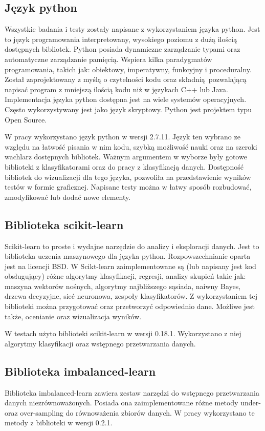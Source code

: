 \subsection{Język python}
Wszystkie badania i testy zostały napisane z wykorzystaniem języka python. Jest to język programowania interpretowany, wysokiego poziomu z dużą ilością dostępnych bibliotek. Python\cite{python} posiada dynamiczne zarządzanie typami oraz automatyczne zarządzanie pamięcią. Wspiera kilka paradygmatów programowania, takich jak: obiektowy, imperatywny, funkcyjny i proceduralny. Został zaprojektowany z myślą o czytelności kodu oraz składnią pozwalającą napisać program z mniejszą ilością kodu niż w językach C++ lub Java. Implementacja języka python dostępna jest na wiele systemów operacyjnych. Często wykorzystywany jest jako język skryptowy. Python jest projektem typu Open Source. \par
W pracy wykorzystano język python w wersji 2.7.11. Język ten wybrano ze względu na łatwość pisania w nim kodu, szybką możliwość nauki oraz na szeroki wachlarz dostępnych bibliotek. Ważnym argumentem w wyborze były gotowe biblioteki z klasyfikatorami oraz do pracy z klasyfikacją danych. Dostępność bibliotek do wizualizacji dla tego języka, pozwoliła na przedstawienie wyników testów w formie graficznej. Napisane testy można w łatwy sposób rozbudować, zmodyfikować lub dodać nowe elementy.    

\subsection{Biblioteka scikit-learn}
Scikit-learn\cite{scikit} to proste i wydajne narzędzie do analizy i eksploracji danych. Jest to biblioteka uczenia maszynowego dla języka python. Rozpowszechnianie oparta jest na licencji BSD. W Scikt-learn zaimplementowane są (lub napisany jest kod obsługujący) różne algorytmy klasyfikacji, regresji, analizy skupień takie jak: maszyna wektorów nośnych, algorytmy najbliższego sąsiada, naiwny Bayes, drzewa decyzyjne, sieć neuronowa, zespoły klasyfikatorów. Z wykorzystaniem tej biblioteki można przygotować oraz przetworzyć odpowiednio dane. Możliwe jest także, ocenianie oraz wizualizacja wyników. \par
W testach użyto biblioteki scikit-learn w wersji 0.18.1. Wykorzystano z niej algorytmy klasyfikacji oraz wstępnego przetwarzania danych.
\subsection{Biblioteka imbalanced-learn}
Biblioteka imbalanced-learn\cite{imlearn} zawiera zestaw narzędzi do wstępnego przetwarzania danych niezrównoważonych. Posiada ona zaimplementowane różne metody under- oraz over-sampling do równoważenia zbiorów danych. W pracy wykorzystano te metody z biblioteki w wersji 0.2.1. 
